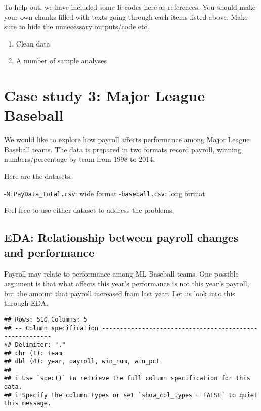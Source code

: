 \documentclass[
]{article}
\begin{document}
To help out, we have included some R-codes here as references. You
should make your own chunks filled with texts going through each items
listed above. Make sure to hide the unnecessary outputs/code etc.

\begin{enumerate}
\def\labelenumi{\arabic{enumi}.}
\item
  Clean data
\item
  A number of sample analyses
\end{enumerate}

\hypertarget{case-study-3-major-league-baseball}{%
\section{Case study 3: Major League
Baseball}\label{case-study-3-major-league-baseball}}

We would like to explore how payroll affects performance among Major
League Baseball teams. The data is prepared in two formats record
payroll, winning numbers/percentage by team from 1998 to 2014.

Here are the datasets:

-\texttt{MLPayData\_Total.csv}: wide format -\texttt{baseball.csv}: long
format

Feel free to use either dataset to address the problems.

\hypertarget{eda-relationship-between-payroll-changes-and-performance}{%
\subsection{EDA: Relationship between payroll changes and
performance}\label{eda-relationship-between-payroll-changes-and-performance}}

Payroll may relate to performance among ML Baseball teams. One possible
argument is that what affects this year's performance is not this year's
payroll, but the amount that payroll increased from last year. Let us
look into this through EDA.

\begin{verbatim}
## Rows: 510 Columns: 5
## -- Column specification --------------------------------------------------------
## Delimiter: ","
## chr (1): team
## dbl (4): year, payroll, win_num, win_pct
## 
## i Use `spec()` to retrieve the full column specification for this data.
## i Specify the column types or set `show_col_types = FALSE` to quiet this message.
\end{verbatim}
\end{document}

